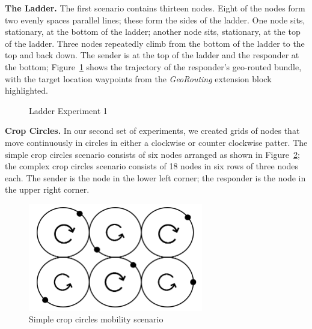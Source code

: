{\bf The Ladder.} The first scenario contains thirteen nodes. Eight of
the nodes form two evenly spaces parallel lines; these form the sides
of the ladder. One node sits, stationary, at the bottom of the ladder;
another node sits, stationary, at the top of the ladder. Three nodes
repeatedly climb from the bottom of the ladder to the top and back
down. {\color{red} The sender is at the top of the ladder and the
  responder at the bottom; Figure~\ref{fig:ladder1} shows the
  trajectory of the responder's geo-routed bundle, with the target
  location waypoints from the {\em GeoRouting} extension block
  highlighted.}
\begin{figure}
\begin{center}
\end{center}
\vspace{-.75cm}
\caption{Ladder Experiment 1}\label{fig:ladder1}
\vspace{-.5cm}
\end{figure}

{\bf Crop Circles.} In our second set of experiments, we created grids
of nodes that move continuously in circles in either a clockwise or
counter clockwise patter. The simple crop circles scenario consists of
six nodes arranged as shown in Figure~\ref{fig:cropcircle1}; the
complex crop circles scenario consists of 18 nodes in six rows of
three nodes each. The sender is the node in the lower left corner; the
responder is the node in the upper right corner.
\begin{figure}
\vspace{-.2cm}
\begin{center}
\includegraphics[width=3in]{figures/cropcircle1.png}
\end{center}
\vspace{-.75cm}
\caption{Simple crop circles mobility scenario}\label{fig:cropcircle1}
\vspace{-.25cm}
\end{figure}

